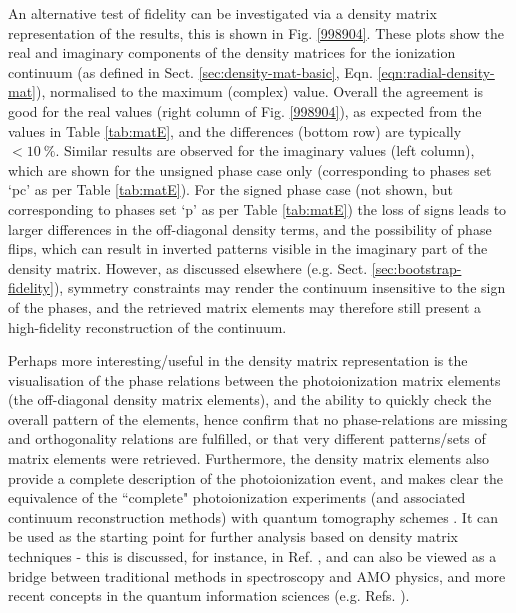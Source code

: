 \documentclass[10pt]{article}
\begin{document}
An alternative test of fidelity can be investigated via a density matrix representation of the results, this is shown in Fig. \ref{998904}. These plots show the real and imaginary components of the density matrices for the ionization continuum (as defined in Sect. \ref{sec:density-mat-basic}, Eqn. \ref{eqn:radial-density-mat}), normalised to the maximum (complex) value. Overall the agreement is good for the real values (right column of Fig. \ref{998904}), as expected from the values in Table \ref{tab:matE}, and the differences (bottom row) are typically $<10~\%$. Similar results are observed for the imaginary values (left column), which are shown for the unsigned phase case only (corresponding to phases set `pc' as per Table \ref{tab:matE}). For the signed phase case (not shown, but corresponding to phases set `p' as per Table \ref{tab:matE}) the loss of signs leads to larger differences in the off-diagonal density terms, and the possibility of phase flips, which 
can result in inverted patterns visible in the imaginary part of the density matrix. However, as discussed elsewhere (e.g. Sect. \ref{sec:bootstrap-fidelity}), symmetry constraints may render the continuum insensitive to the sign of the phases, and the retrieved matrix elements may therefore still present a high-fidelity reconstruction of the continuum.

Perhaps more interesting/useful in the density matrix representation is the visualisation of the phase relations between the photoionization matrix elements (the off-diagonal density matrix elements), and the ability to quickly check the overall pattern of the elements, hence confirm that no phase-relations are missing and orthogonality relations are fulfilled, or that very different patterns/sets of matrix elements were retrieved. Furthermore, the density matrix elements also provide a complete description of the photoionization event, and makes clear the equivalence of the ``complete" photoionization experiments (and associated continuum reconstruction methods) with quantum tomography schemes \cite{MauroDAriano2003}. It can be used as the starting point for further analysis based on density matrix techniques - this is discussed, for instance, in Ref. \cite{BlumDensityMat}, and can also be viewed as a bridge between traditional methods in spectroscopy and AMO physics, and more recent concepts in the quantum information sciences (e.g. Refs.  \cite{Tichy2011a,Yuen-Zhou2014}).
\end{document}
